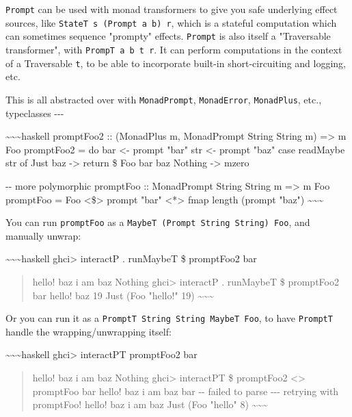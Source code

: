 \documentclass[]{article}
\begin{document}
\texttt{Prompt} can be used with monad transformers to give you safe underlying
effect sources, like \texttt{StateT\ s\ (Prompt\ a\ b)\ r}, which is a stateful
computation which can sometimes sequence "prompty" effects. \texttt{Prompt} is
also itself a "Traversable transformer", with \texttt{PrompT\ a\ b\ t\ r}. It
can perform computations in the context of a Traversable \texttt{t}, to be able
to incorporate built-in short-circuiting and logging, etc.

This is all abstracted over with \texttt{MonadPrompt}, \texttt{MonadError},
\texttt{MonadPlus}, etc., typeclasses -\/-\/-

\textasciitilde{}\textasciitilde{}\textasciitilde{}haskell promptFoo2 ::
(MonadPlus m, MonadPrompt String String m) =\textgreater{} m Foo promptFoo2 = do
bar \textless{}- prompt "bar" str \textless{}- prompt "baz" case readMaybe str
of Just baz -\textgreater{} return \$ Foo bar baz Nothing -\textgreater{} mzero

-\/- more polymorphic promptFoo :: MonadPrompt String String m =\textgreater{} m
Foo promptFoo = Foo \textless{}\$\textgreater{} prompt "bar"
\textless{}*\textgreater{} fmap length (prompt "baz")
\textasciitilde{}\textasciitilde{}\textasciitilde{}

You can run \texttt{promptFoo} as a
\texttt{MaybeT\ (Prompt\ String\ String)\ Foo}, and manually unwrap:

\textasciitilde{}\textasciitilde{}\textasciitilde{}haskell ghci\textgreater{}
interactP . runMaybeT \$ promptFoo2 bar

\begin{quote}
hello! baz i am baz Nothing ghci\textgreater{} interactP . runMaybeT \$
promptFoo2 bar hello! baz 19 Just (Foo "hello!" 19)
\textasciitilde{}\textasciitilde{}\textasciitilde{}
\end{quote}

Or you can run it as a \texttt{PromptT\ String\ String\ MaybeT\ Foo}, to have
\texttt{PromptT} handle the wrapping/unwrapping itself:

\textasciitilde{}\textasciitilde{}\textasciitilde{}haskell ghci\textgreater{}
interactPT promptFoo2 bar

\begin{quote}
hello! baz i am baz Nothing ghci\textgreater{} interactPT \$ promptFoo2
\textless{}\textbar{}\textgreater{} promptFoo bar hello! baz i am baz bar -\/-
failed to parse -\/-\/- retrying with promptFoo! hello! baz i am baz Just (Foo
"hello" 8) \textasciitilde{}\textasciitilde{}\textasciitilde{}
\end{quote}
\end{document}

